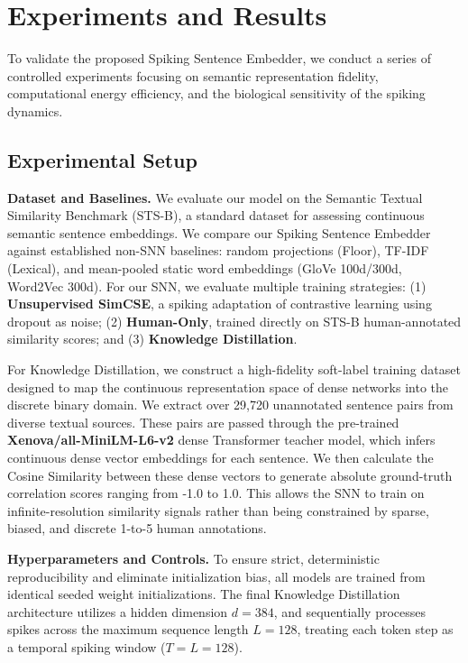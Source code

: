 \documentclass{article} %
\begin{document}
\section{Experiments and Results}
\label{sec:experiments}

To validate the proposed Spiking Sentence Embedder, we conduct a series of controlled experiments focusing on semantic representation fidelity, computational energy efficiency, and the biological sensitivity of the spiking dynamics.

\subsection{Experimental Setup}
\textbf{Dataset and Baselines.} We evaluate our model on the Semantic Textual Similarity Benchmark (STS-B), a standard dataset for assessing continuous semantic sentence embeddings. We compare our Spiking Sentence Embedder against established non-SNN baselines: random projections (Floor), TF-IDF (Lexical), and mean-pooled static word embeddings (GloVe 100d/300d, Word2Vec 300d). For our SNN, we evaluate multiple training strategies: (1) \textbf{Unsupervised SimCSE}, a spiking adaptation of contrastive learning using dropout as noise; (2) \textbf{Human-Only}, trained directly on STS-B human-annotated similarity scores; and (3) \textbf{Knowledge Distillation}. 

For Knowledge Distillation, we construct a high-fidelity soft-label training dataset designed to map the continuous representation space of dense networks into the discrete binary domain. We extract over 29,720 unannotated sentence pairs from diverse textual sources. These pairs are passed through the pre-trained \textbf{Xenova/all-MiniLM-L6-v2} dense Transformer teacher model, which infers continuous dense vector embeddings for each sentence. We then calculate the Cosine Similarity between these dense vectors to generate absolute ground-truth correlation scores ranging from -1.0 to 1.0. This allows the SNN to train on infinite-resolution similarity signals rather than being constrained by sparse, biased, and discrete 1-to-5 human annotations.

\textbf{Hyperparameters and Controls.} To ensure strict, deterministic reproducibility and eliminate initialization bias, all models are trained from identical seeded weight initializations. The final Knowledge Distillation architecture utilizes a hidden dimension $d=384$, and sequentially processes spikes across the maximum sequence length $L=128$, treating each token step as a temporal spiking window ($T=L=128$).
\end{document}

